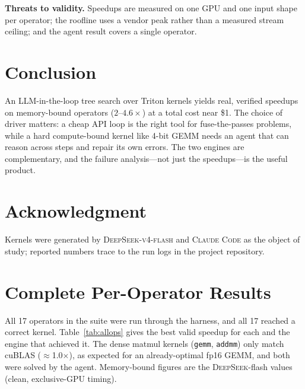 \documentclass[conference]{IEEEtran}
\newcommand{\mainbodyendpage}{?}
\begin{document}
\textbf{Threats to validity.} Speedups are measured on one GPU and one input
shape per operator; the roofline uses a vendor peak rather than a measured stream
ceiling; and the agent result covers a single operator.

\section{Conclusion}
An LLM-in-the-loop tree search over Triton kernels yields real, verified speedups
on memory-bound operators ($2$--$4.6\times$) at a total cost near \$1. The choice
of driver matters: a cheap API loop is the right tool for fuse-the-passes
problems, while a hard compute-bound kernel like 4-bit GEMM needs an agent that
can reason across steps and repair its own errors. The two engines are
complementary, and the failure analysis---not just the speedups---is the useful
product.

\section*{Acknowledgment}
Kernels were generated by \textsc{DeepSeek-v4-flash} and \textsc{Claude Code} as
the object of study; reported numbers trace to the run logs in the project
repository.




\xdef\mainbodyendpage{\thepage}

\appendices

\section{Complete Per-Operator Results}
\label{app:allops}
All 17 operators in the suite were run through the harness, and all 17 reached a
correct kernel. Table~\ref{tab:allops} gives the best valid speedup for each and
the engine that achieved it. The dense matmul kernels (\texttt{gemm},
\texttt{addmm}) only match cuBLAS ($\approx$1.0$\times$), as expected for an
already-optimal fp16 GEMM, and both were solved by the agent. Memory-bound figures
are the \textsc{DeepSeek}-flash values (clean, exclusive-GPU timing).
\end{document}
